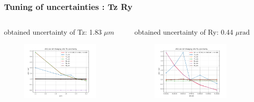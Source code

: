 \documentclass[aspectratio=1610, 12pt]{beamer}
\begin{document}
\begin{frame}\frametitle{Tuning of uncertainties : Tz Ry}
  \begin{columns}
    \begin{column}[c]{0.48\textwidth}
      obtained uncertainty of Tz: 1.83 $\mu m$
      \begin{figure}
        \includegraphics[width=0.9\textwidth]{plots/retest/Tz_set_TxTzRx_full_fit.pdf}
      \end{figure}
    \end{column}
    \begin{column}[c]{0.48\textwidth}
      obtained uncertainty of Ry: 0.44 $\mu \text{rad}$
      \begin{figure}
        \includegraphics[width=0.9\textwidth]{plots/retest/everything_set_but_Ry_full_fit.pdf}
      \end{figure}
    \end{column}
  \end{columns}
\end{frame}
\end{document}
